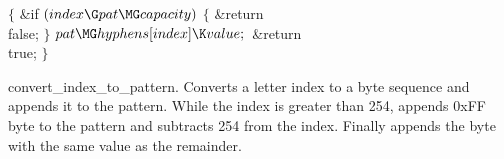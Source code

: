 ${}\{{}$\1\6
\&{if} ${}(\\{index}\G\\{pat}\MG\\{capacity}){}$\5
${}\{{}$\1\6
\&{return} \\{false};\6
\4${}\}{}$\2\6
${}\\{pat}\MG\\{hyphens}[\\{index}]\K\\{value};{}$\6
\&{return} \\{true};\6
\4${}\}{}$\2\par
\fi

convert\_index\_to\_pattern.
Converts a letter index to a byte sequence and appends it to the pattern.
While the index is greater than 254, appends 0xFF byte to the pattern and
subtracts 254 from the index. Finally appends the byte with the same
value as the remainder.

